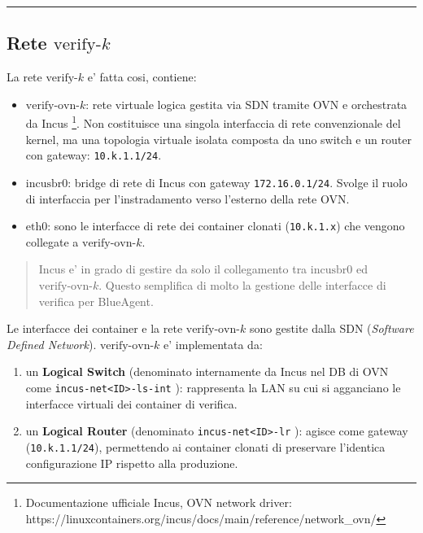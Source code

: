 \begin{center}\rule{0.5\linewidth}{0.5pt}\end{center}

\subsection{\texorpdfstring{Rete
\(\text{verify-}k\)}{Rete \textbackslash text\{verify-\}k}}\label{rete-textverify-k}

La rete \(\text{verify-}k\) e' fatta cosi, contiene:

\begin{itemize}
\tightlist
\item
  \(\text{verify-ovn-}k\): rete virtuale logica gestita via SDN tramite
  OVN e orchestrata da Incus \footnote{\label{fn:ref_16}Documentazione ufficiale Incus,
    OVN network driver:
    https://linuxcontainers.org/incus/docs/main/reference/network\_ovn/}.
  Non costituisce una singola interfaccia di rete convenzionale del
  kernel, ma una topologia virtuale isolata composta da uno switch e un
  router con gateway: \passthrough{\lstinline!10.k.1.1/24!}.
\item
  \(\text{incusbr0}\): bridge di rete di Incus con gateway
  \passthrough{\lstinline!172.16.0.1/24!}. Svolge il ruolo di
  interfaccia per l'instradamento verso l'esterno della rete OVN.
\item
  \(\text{eth0}\): sono le interfacce di rete dei container clonati
  (\passthrough{\lstinline!10.k.1.x!}) che vengono collegate a
  \(\text{verify-ovn-}k\).
\end{itemize}

\begin{quote}
Incus e' in grado di gestire da solo il collegamento tra
\(\text{incusbr0}\) ed \(\text{verify-ovn-}k\). Questo semplifica di
molto la gestione delle interfacce di verifica per BlueAgent.
\end{quote}

Le interfacce dei container e la rete \(\text{verify-ovn-}k\) sono
gestite dalla SDN (\emph{Software Defined Network}).
\(\text{verify-ovn-}k\) e' implementata da:

\begin{enumerate}
\def\labelenumi{\arabic{enumi}.}
\tightlist
\item
  un \textbf{Logical Switch} (denominato internamente da Incus nel DB di
  OVN come \passthrough{\lstinline!incus-net<ID>-ls-int!} ):
  rappresenta la LAN su cui si agganciano le interfacce virtuali dei
  container di verifica.
\item
  un \textbf{Logical Router} (denominato
  \passthrough{\lstinline!incus-net<ID>-lr!} ):
  agisce come gateway (\passthrough{\lstinline!10.k.1.1/24!}),
  permettendo ai container clonati di preservare l'identica
  configurazione IP rispetto alla produzione.
\end{enumerate}

